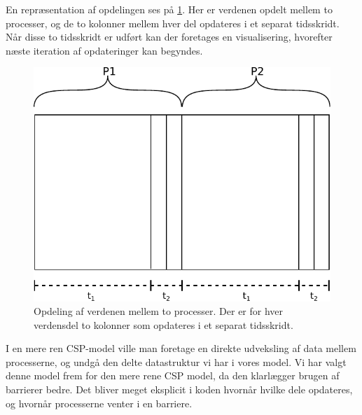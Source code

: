 En repræsentation af opdelingen ses på \cref{fig:wator}. Her er verdenen 
opdelt mellem to processer, og de to kolonner mellem hver del opdateres i et 
separat tidsskridt. Når disse to tidsskridt er udført kan der foretages en 
visualisering, hvorefter næste iteration af opdateringer kan begyndes. 
\begin{figure}[hbtp] \begin{center}
  \includegraphics[scale=0.75]{images/wator}
  \caption{Opdeling af verdenen mellem to processer. Der er for hver verdensdel 
  to kolonner som opdateres i et separat tidsskridt.}
  \label{fig:wator}
  \end{center}
\end{figure}

I en mere ren CSP-model ville man foretage en direkte udveksling af data mellem 
processerne, og undgå den delte datastruktur vi har i vores model.  Vi har 
valgt denne model frem for den mere rene CSP model, da den klarlægger brugen af 
barrierer bedre.  Det bliver meget eksplicit i koden hvornår hvilke dele 
opdateres, og hvornår processerne venter i en barriere.

